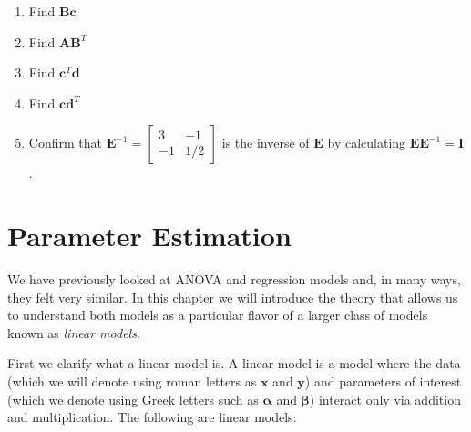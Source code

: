 \documentclass[]{book}
\providecommand{\tightlist}{%
  \setlength{\itemsep}{0pt}\setlength{\parskip}{0pt}}
\theoremstyle{definition}
\theoremstyle{definition}
\theoremstyle{remark}
\begin{document}
\begin{enumerate}
\def\labelenumi{\arabic{enumi}.}
\tightlist
\item
  Find \(\mathbf{Bc}\)
\item
  Find \(\mathbf{AB}^{T}\)
\item
  Find \(\mathbf{c}^{T}\mathbf{d}\)
\item
  Find \(\mathbf{cd}^{T}\)
\item
  Confirm that
  \(\mathbf{E}^{-1}=\left[\begin{array}{cc}  3 & -1\\  -1 & 1/2 \end{array}\right]\)
  is the inverse of \(\mathbf{E}\) by calculating
  \(\mathbf{E}\mathbf{E}^{-1}=\mathbf{I}\).
\end{enumerate}

\chapter{Parameter Estimation}\label{parameter-estimation}

We have previously looked at ANOVA and regression models and, in many
ways, they felt very similar. In this chapter we will introduce the
theory that allows us to understand both models as a particular flavor
of a larger class of models known as \emph{linear models}.

First we clarify what a linear model is. A linear model is a model where
the data (which we will denote using roman letters as \(\boldsymbol{x}\)
and \(\boldsymbol{y}\)) and parameters of interest (which we denote
using Greek letters such as \(\boldsymbol{\alpha}\) and
\(\boldsymbol{\beta}\)) interact only via addition and multiplication.
The following are linear models:
\end{document}
